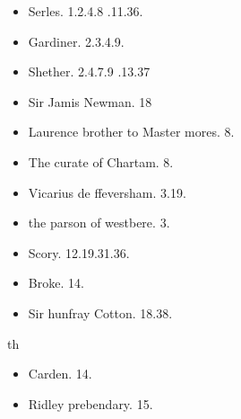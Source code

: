 \documentclass[12pt, a4paper]{book}
\begin{document}
            		
			 	\begin{itemize}
				 	\item[]Serles. 1.2.4.8
			.11.36.
				 	\item[]Gardiner. 2.3.4.9.
				 	\item[]Shether. 2.4.7.9
			.13.37
				 \end{itemize}
            			\begin{itemize}
            				\item[]Sir Jamis Newman. 18
            				\item[]Laurence brother to Master mores. 8.
            				\item[]The curate of Chartam. 8. 
            			\end{itemize}
			 

            		
            			
				\marginpar[\vspace{0.5cm}{\textcolor{Gray}{n}}]{}
			
            			\begin{itemize}
            				\item[]Vicarius de ffeversham. 3.19.
					\item[]the parson of westbere. 3.
            			\end{itemize}
            			\begin{itemize}
            				\item[]Scory. 12.19.31.36.
            				\item[]Broke. 14.
            			\end{itemize}
            		
			
				
				\marginpar[\vspace{0.5cm}{\textcolor{Gray}{th n}}]{}
			
				\begin{itemize}
					\item[]Sir hunfray Cotton. 18.38.
				\end{itemize}
				th
				\begin{itemize}
					\item[]Carden. 14.
					\item[]Ridley prebendary. 15.
				\end{itemize}
			
\end{document}
